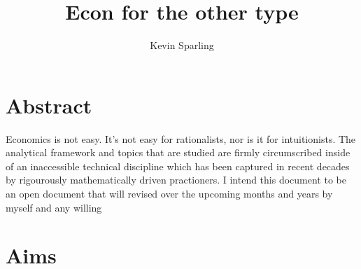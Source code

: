 \documentclass[11pt]{article}
\title{Econ for the other type}
\author{Kevin Sparling}
\begin{document}
\maketitle
\clearpage

\section{Abstract}
Economics is not easy. It's not easy for rationalists, nor is it for intuitionists. The analytical framework
and topics that are studied are firmly circumscribed inside of an inaccessible technical discipline which has been
captured in recent decades by rigourously mathematically driven practioners. I intend this document to be an open document
that will revised over the upcoming months and years by myself and any willing 


\section{Aims}
\end{document}

